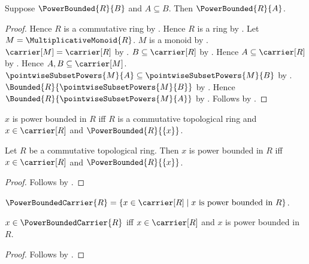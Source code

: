 \begin{theorem}\label{power_bounded_set_downward}
    Suppose $\PowerBounded{R}{B}$ and $A\subseteq B$.
    Then $\PowerBounded{R}{A}$.
\end{theorem}
\begin{proof}
    Hence $R$ is a commutative ring by
        .
    Hence $R$ is a ring by .
    Let $M=\MultiplicativeMonoid{R}$.
    $M$ is a monoid by .
    $\carrier[M]=\carrier[R]$ by .
    $B\subseteq\carrier[R]$ by .
    Hence $A\subseteq\carrier[R]$ by .
    Hence $A,B\subseteq\carrier[M]$.
    $\pointwiseSubsetPowers{M}{A}
        \subseteq\pointwiseSubsetPowers{M}{B}$ by
        .
    $\Bounded{R}{\pointwiseSubsetPowers{M}{B}}$ by
        .
    Hence $\Bounded{R}{\pointwiseSubsetPowers{M}{A}}$ by
        .
    Follows by .
\end{proof}

\begin{definition}\label{power_bounded_element}
    $x$ is power bounded in $R$ iff
        $R$ is a commutative topological ring and $x\in\carrier[R]$ and
        $\PowerBounded{R}{\{x\}}$.
\end{definition}

\begin{proposition}\label{power_bounded_element_iff}
    Let $R$ be a commutative topological ring.
    Then $x$ is power bounded in $R$ iff
        $x\in\carrier[R]$ and $\PowerBounded{R}{\{x\}}$.
\end{proposition}
\begin{proof}
    Follows by .
\end{proof}

\begin{definition}\label{power_bounded_carrier}
    $\PowerBoundedCarrier{R}=\{x\in\carrier[R]\mid
        \text{$x$ is power bounded in $R$}\}$.
\end{definition}

\begin{proposition}\label{power_bounded_carrier_iff}
    $x\in\PowerBoundedCarrier{R}$ iff
        $x\in\carrier[R]$ and $x$ is power bounded in $R$.
\end{proposition}
\begin{proof}
    Follows by .
\end{proof}

